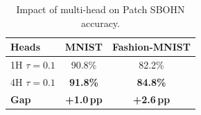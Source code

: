\begin{table}[h]
\centering
\caption{Impact of multi-head on Patch SBOHN accuracy.}
\begin{tabular}{lcc}
\hline
\textbf{Heads} & \textbf{MNIST} & \textbf{Fashion-MNIST} \\
\hline
1H $\tau{=}0.1$ & 90.8\% & 82.2\% \\
4H $\tau{=}0.1$ & \textbf{91.8\%} & \textbf{84.8\%} \\
\textbf{Gap} & \textbf{+1.0\,pp} & \textbf{+2.6\,pp} \\
\hline
\end{tabular}
\end{table}
